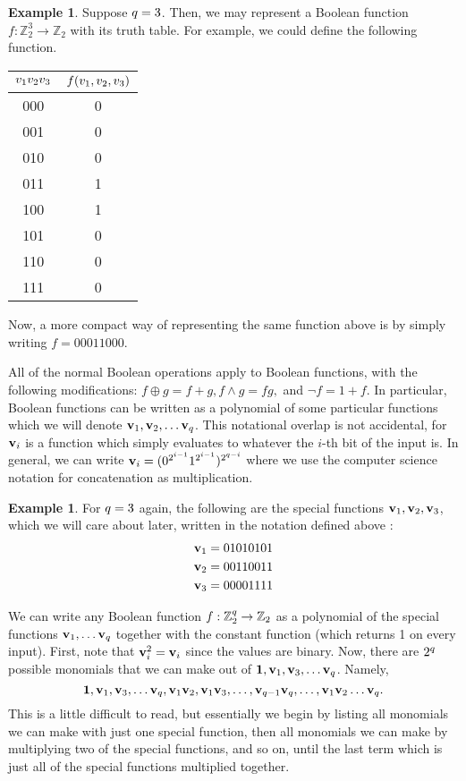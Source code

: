 \documentclass[12pt,twoside]{reedthesis}
\theoremstyle{definition}
\newtheorem{example}[theorem]{Example}
\newlength{\arrow}
\newcommand{\Z}{\mathbb{Z}}
\begin{document}
\begin{example}
Suppose $q = 3$. Then, we may represent a Boolean function $f: \Z_2^3 \rightarrow \Z_2$ with its truth table. For example, we could define the following function.
\begin{center}
\begin{tabular}{ |c|c| } 
 \hline
$ v_{1}v_{2}v_{3}$ &$f(v_{1}, v_{2}, v_{3})$  \\ 
\hline
000 & 0  \\ 
001 & 0 \\
010 & 0 \\
011 & 1\\
100 & 1\\
101 & 0\\
110 & 0\\
111 & 0 \\
 \hline
\end{tabular}
\end{center}
Now, a more compact way of representing the same function above is by simply writing $f = 00011000$. 
\end{example}
All of the normal Boolean operations apply to Boolean functions, with the following modifications: $f \oplus g = f+g, f \land g = fg, $ and $\lnot f = 1 + f$. In particular, Boolean functions can be written as a polynomial of some particular functions which we will denote $\mathbf{v}_{1}, \mathbf{v}_{2}, \ldots \mathbf{v}_{q}$. This notational overlap is not accidental, for $\mathbf{v}_{i}$ is a function which simply evaluates to whatever the $i$-th bit of the input is. In general, we can write $\mathbf{v}_{i} = (0^{2^{i-1}} 1^{2^{i-1}})^{2^{q-i}}$ where we use the computer science notation for concatenation as multiplication.
\begin{example}
For $q = 3$ again, the following are the special functions $\mathbf{v}_{1}, \mathbf{v}_{2}, \mathbf{v}_{3}$, which we will care about later,  written in the notation defined above :
\begin{align*}
& \mathbf{v}_{1} = 01010101 \\
& \mathbf{v}_{2} = 00110011\\
&\mathbf{v}_{3} = 00001111
\end{align*}
\end{example}
We can write any Boolean function $f: \Z_2^\numin \rightarrow \Z_2$ as a polynomial of the special functions $\mathbf{v}_{1}, \ldots \mathbf{v}_{q}$ together with the constant function \consto (which returns 1 on every input).  First, note that $\mathbf{v}_{i}^2 = \mathbf{v}_{i}$ since the values are binary. Now, there are $2^q$ possible monomials that we can make out of $\mathbf{1}, \mathbf{v}_{1}, \mathbf{v}_{3},\ldots \mathbf{v}_{q}$. Namely, 
\begin{equation}
\mathbf{1}, \mathbf{v}_{1}, \mathbf{v}_{3},\ldots \mathbf{v}_{q}, \mathbf{v}_{1}\mathbf{v}_{2}, \mathbf{v}_{1}\mathbf{v}_{3}, \ldots, \mathbf{v}_{q -1}\mathbf{v}_{q}, \ldots, \mathbf{v}_{1}\mathbf{v}_{2}\ldots\mathbf{v}_{q}.
\end{equation}
This is a little difficult to read, but essentially we begin by listing all monomials we can make with just one special function, then all monomials we can make by multiplying two of the special functions, and so on, until the last term which is just all of the special functions multiplied together.
\end{document}
